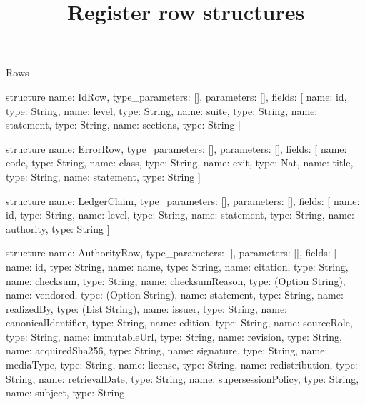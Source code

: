 \begin{lexlean}{Rows}
\title{Register row structures}
\begin{semanticmodule}
structure{
  name: IdRow,
  type_parameters: [],
  parameters: [],
  fields: [
    {name: id, type: String},
    {name: level, type: String},
    {name: suite, type: String},
    {name: statement, type: String},
    {name: sections, type: String}
  ]
}

structure{
  name: ErrorRow,
  type_parameters: [],
  parameters: [],
  fields: [
    {name: code, type: String},
    {name: class, type: String},
    {name: exit, type: Nat},
    {name: title, type: String},
    {name: statement, type: String}
  ]
}

structure{
  name: LedgerClaim,
  type_parameters: [],
  parameters: [],
  fields: [
    {name: id, type: String},
    {name: level, type: String},
    {name: statement, type: String},
    {name: authority, type: String}
  ]
}

structure{
  name: AuthorityRow,
  type_parameters: [],
  parameters: [],
  fields: [
    {name: id, type: String},
    {name: name, type: String},
    {name: citation, type: String},
    {name: checksum, type: String},
    {name: checksumReason, type: (Option String)},
    {name: vendored, type: (Option String)},
    {name: statement, type: String},
    {name: realizedBy, type: (List String)},
    {name: issuer, type: String},
    {name: canonicalIdentifier, type: String},
    {name: edition, type: String},
    {name: sourceRole, type: String},
    {name: immutableUrl, type: String},
    {name: revision, type: String},
    {name: acquiredSha256, type: String},
    {name: signature, type: String},
    {name: mediaType, type: String},
    {name: license, type: String},
    {name: redistribution, type: String},
    {name: retrievalDate, type: String},
    {name: supersessionPolicy, type: String},
    {name: subject, type: String}
  ]
}
\end{semanticmodule}
\end{lexlean}
